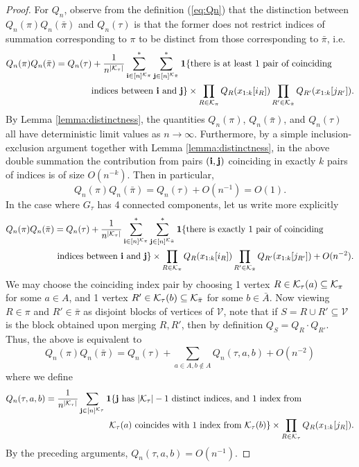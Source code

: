 \documentclass[10pt,reqno]{amsart}
\def\cV{\mathcal{V}}
\def\1{\mathbf{1}}
\def\bi{\mathbf{i}}
\begin{document}
\begin{proof}
For $Q_n$, observe from the definition (\ref{eq:Qn}) that
the distinction between $Q_n(\pi)Q_n(\bar\pi)$ and $Q_n(\tau)$ is that the
former does not restrict indices of summation corresponding to $\pi$ to be
distinct from those corresponding to $\bar\pi$, i.e.
\begin{align*}
Q_n(\pi)Q_n(\bar\pi)&=Q_n(\tau)
+\frac{1}{n^{|\cK_\tau|}} \sum_{\bi \in [n]^{\cK_\pi}}^*
\sum_{\bj \in [n]^{\cK_{\bar\pi}}}^* \1\{\text{there is at least 1
pair of coinciding}\\
&\hspace{0.5in} \text{ indices between } \bi \text{ and } \bj\}
\times \prod_{R \in \cK_\pi} Q_R(x_{1:k}[i_R])
\prod_{R' \in \cK_{\bar\pi}} Q_{R'}(x_{1:k}[j_{R'}]).
\end{align*}
By Lemma \ref{lemma:distinctness}, the quantities $Q_n(\pi)$, $Q_n(\bar\pi)$,
and $Q_n(\tau)$ all have deterministic limit values as $n \to \infty$.
Furthermore, by a simple inclusion-exclusion argument together with
Lemma \ref{lemma:distinctness}, in the above double summation
the contribution from pairs $(\bi,\bj)$ coinciding in exactly $k$ pairs of
indices is of size $O(n^{-k})$. Then in particular,
\begin{equation}\label{eq:Qnapprox1}
Q_n(\pi)Q_n(\bar\pi)=Q_n(\tau)+O(n^{-1})=O(1).
\end{equation}
In the case where $G_\tau$ has 4 connected components, let us write more
explicitly
\begin{align*}
Q_n(\pi)Q_n(\bar\pi)&=Q_n(\tau)
+\frac{1}{n^{|\cK_\tau|}} \sum_{\bi \in [n]^{\cK_\pi}}^*
\sum_{\bj \in [n]^{\cK_{\bar\pi}}}^* \1\{\text{there is exactly 1 pair of
coinciding}\\
&\text{ indices between } \bi \text{ and } \bj\}
\times \prod_{R \in \cK_\pi} Q_R(x_{1:k}[i_R])
\prod_{R' \in \cK_{\bar\pi}} Q_{R'}(x_{1:k}[j_{R'}]) + O(n^{-2}).
\end{align*}
We may choose the coinciding index pair by choosing 1 vertex
$R \in \mathcal{K}_\tau(a) \subseteq \mathcal{K}_\pi$ for some $a \in A$,
and 1 vertex $R' \in \mathcal{K}_\tau(b) \subseteq \mathcal{K}_{\bar \pi}$
for some $b \in \bar A$. Now viewing $R \in \pi$ and $R' \in \bar\pi$ as disjoint
blocks of vertices of $\cV$, note that if $S=R \cup R' \subseteq \cV$
is the block obtained upon merging $R,R'$,
then by definition $Q_S=Q_R \cdot Q_{R'}$. Thus, the above is equivalent to
\begin{equation}\label{eq:Qnapprox2}
Q_n(\pi)Q_n(\bar\pi)=Q_n(\tau)+\sum_{a \in A,b \notin A} Q_n(\tau,a,b)+O(n^{-2})
\end{equation}
where we define
\begin{align*}
Q_n(\tau,a,b)
&=\frac{1}{n^{|\cK_\tau|}} \sum_{\bj \in [n]^{\cK_\tau}}
\1\{\bj \text{ has } |\cK_\tau|-1 \text{ distinct indices, and 1 index from }\\
&\hspace{1in} \cK_\tau(a) \text{ coincides with 1 index
from } \cK_\tau(b)\} \times \prod_{R \in \cK_\tau} Q_R(x_{1:k}[j_R]).
\end{align*}
By the preceding arguments, $Q_n(\tau,a,b)=O(n^{-1})$.


\end{proof}
\end{document}
